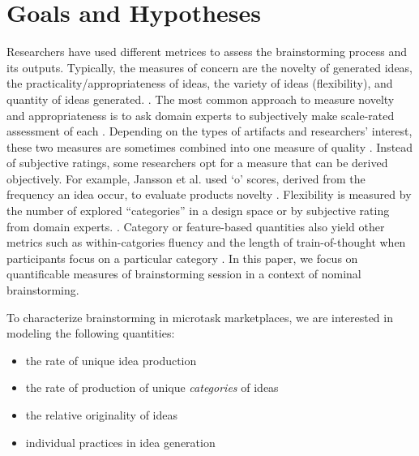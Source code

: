 \section{Goals and Hypotheses}

Researchers have used different metrices to assess the brainstorming process and its outputs. Typically, the measures of concern are the novelty of generated ideas, the practicality/appropriateness of ideas, the variety of ideas (flexibility), and quantity of ideas generated. \cite{finke1992creative, shah2003metrics}. The most common approach to measure novelty and appropriateness is to ask domain experts to subjectively make scale-rated assessment of each \cite{lewis2011affective, amabile_1983}. Depending on the types of artifacts and researchers' interest, these two measures are sometimes combined into one measure of quality \cite{little2010exploring}. Instead of subjective ratings, some researchers opt for a measure that can be derived objectively. For example, Jansson et al. used `o' scores, derived from the frequency an idea occur, to evaluate products novelty \cite{jansson_design_1991}. Flexibility is measured by the number of explored ``categories'' in a design space or by subjective rating from domain experts. \cite{lewis2011affective, marsh1996examples}. Category or feature-based quantities also yield other metrics such as within-catgories fluency and  the length of train-of-thought when participants focus on a particular category \cite{nijstad_how_2006}. In this paper, we focus on quantificable measures of brainstorming session in a context of nominal brainstorming.


To characterize brainstorming in microtask marketplaces, we are interested in modeling the following quantities:
\begin{itemize}
\item the rate of unique idea production
\item the rate of production of unique \emph{categories} of ideas
\item the relative originality of ideas
\item individual practices in idea generation
\end{itemize}

